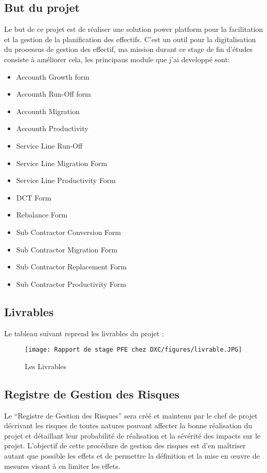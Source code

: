 \subsection{But du projet}
Le but de ce projet est de réaliser une solution power platform pour la facilitation et la gestion de la planification des effectifs. C’est un outil pour la digitalisation du processus de gestion des effectif, ma mission durant ce stage de fin d’études consiste à améliorer cela, les principaus module que j'ai developpé sont:
\\
\begin{itemize}
  \item Accounth Growth form
  \item Accounth Run-Off form
  \item Accounth Migration
  \item Accounth Productivity
  \item Service Line Run-Off
  \item Service Line Migration Form
  \item Service Line Productivity Form
  \item DCT Form
  \item Rebalance Form
  \item Sub Contractor Conversion Form
  \item Sub Contractor Migration Form
  \item Sub Contractor Replacement Form
  \item Sub Contractor Productivity Form
\end{itemize}

\newpage

\subsection{Livrables}
Le tableau suivant reprend les livrables du projet :

\begin{figure}[!h]
    \centering
    \texttt{[image: Rapport de stage PFE chez DXC/figures/livrable.JPG]}
    \caption{Les Livrables}
\end{figure}

\subsection{Registre de Gestion des Risques} 

Le “Registre de Gestion des Risques” sera créé et maintenu par le chef de projet
décrivant les risques de toutes natures pouvant affecter la bonne réalisation du projet et
détaillant leur probabilité de réalisation et la sévérité des impacts sur le projet. L’objectif de cette procédure de gestion des risques est d’en maîtriser autant que possible les effets et de permettre la définition et la mise en œuvre de mesures visant à en limiter les effets.


